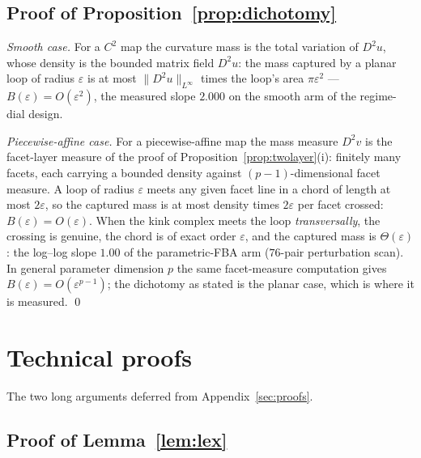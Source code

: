 \documentclass[11pt,a4paper]{article}
\theoremstyle{plain}
\theoremstyle{definition}
\theoremstyle{remark}
\begin{document}
\subsection{Proof of Proposition~\ref{prop:dichotomy}}

\emph{Smooth case.} For a $C^{2}$ map the curvature mass is the
total variation of $D^{2}u$, whose density is the bounded matrix
field $D^{2}u$: the mass captured by a planar loop of radius
$\varepsilon$ is at most $\|D^{2}u\|_{L^{\infty}}$ times the loop's
area $\pi\varepsilon^{2}$ --- $B(\varepsilon) = O(\varepsilon^{2})$,
the measured slope $2.000$ on the smooth arm of the regime-dial
design.

\emph{Piecewise-affine case.} For a piecewise-affine map the mass
measure $D^{2}v$ is the facet-layer measure of the proof of
Proposition~\ref{prop:twolayer}(i): finitely many facets, each
carrying a bounded density against $(p-1)$-dimensional facet
measure. A loop of radius $\varepsilon$ meets any given facet line
in a chord of length at most $2\varepsilon$, so the captured mass is
at most density times $2\varepsilon$ per facet crossed:
$B(\varepsilon) = O(\varepsilon)$. When the kink complex meets the
loop \emph{transversally}, the crossing is genuine, the chord is of
exact order $\varepsilon$, and the captured mass is
$\Theta(\varepsilon)$: the log--log slope $1.00$ of the
parametric-FBA arm ($76$-pair perturbation scan). In general
parameter dimension $p$ the same facet-measure computation gives
$B(\varepsilon) = O(\varepsilon^{p-1})$; the dichotomy as stated is
the planar case, which is where it is measured. \qed

\section{Technical proofs}\label{sec:techproofs}

The two long arguments deferred from Appendix~\ref{sec:proofs}.

\subsection{Proof of Lemma~\ref{lem:lex}}
\end{document}
